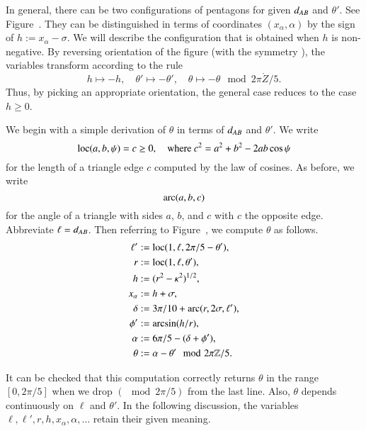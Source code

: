 
In general, there can be two configurations of pentagons for given
$d_{AB}$ and $\theta'$. See Figure~.  They can
be distinguished in terms of coordinates $(x_\alpha,\alpha)$ by the sign
of $h := x_\alpha-\sigma$.  We will describe the configuration that is
obtained when $h$ is non-negative.  By reversing orientation of the
figure (with the symmetry ), the variables transform according to the rule
\[
h \mapsto -h,\quad 
\theta' \mapsto -\theta',
\quad 
\theta\mapsto -\theta \mod 2\pi\ring{Z}/5.
\]
Thus, by picking an appropriate orientation, the general case reduces
to the case $h\ge0$.

We begin with a simple derivation of $\theta$ in terms of
$d_{AB}$ and $\theta'$.  We write
\[
{\operatorname{loc}}(a,b,\psi) = c\ge 0,\quad 
\text{where } c^2 = a^2 + b^2 - 2ab \cos\psi
\]
for the length of a triangle edge $c$ computed by the law of cosines.
As before, we write
\[
\operatorname{arc}(a,b,c)
\]
for the angle of a triangle with sides $a$, $b$, and $c$ with $c$ the
opposite edge.  Abbreviate $\ell = d_{AB}$.  Then referring to
Figure~, we compute $\theta$ as follows.
\begin{align*}
\ell' &:= {\operatorname{loc}}(1,\ell,2\pi/5 - \theta'),\\
r &:= {\operatorname{loc}}(1,\ell,\theta'),\\
h &:= (r^2 -\kappa^2)^{1/2},\\
x_\alpha & := h + \sigma,\\
\delta & := 3\pi/10 + \operatorname{arc}(r,2\sigma,\ell'),\\
\phi' &:= \arcsin (h/r),\\
\alpha &:= 6\pi/5 - (\delta+\phi'),\\
\theta &:= \alpha - \theta' \mod 2\pi\mathbb{Z}/5.
\end{align*}


It can be checked that this computation correctly returns $\theta$ in
the range $[0,2\pi/5]$ when we drop $(\mod 2\pi/5)$ from the last
line.  Also, $\theta$ depends continuously on $\ell$ and $\theta'$.
In the following discussion, the variables
$\ell,\ell',r,h,x_\alpha,\alpha,\ldots$ retain their given meaning.

